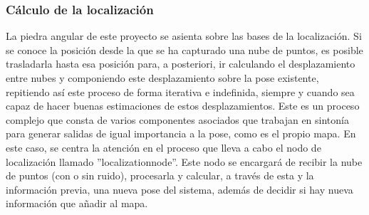 \documentclass[12pt, a4paper, twoside]{article}
\begin{document}
\subsubsection{Cálculo de la localización}
La piedra angular de este proyecto se asienta sobre las bases de la localización. Si se conoce la posición desde la que se ha capturado una nube de puntos, 
es posible trasladarla hasta esa posición para, a posteriori, ir calculando el desplazamiento entre nubes y componiendo este desplazamiento sobre la pose 
existente, repitiendo así este proceso de forma iterativa e indefinida, siempre y cuando sea capaz de hacer buenas estimaciones de estos desplazamientos. \newline
Este es un proceso complejo que consta de varios componentes asociados que trabajan en sintonía para generar salidas de igual importancia a la pose, como 
es el propio mapa. En este caso, se centra la atención en el proceso que lleva a cabo el nodo de localización llamado ''localization\textunderscore node''. 
Este nodo se encargará de recibir la nube de puntos (con o sin ruido), procesarla y calcular, a través de esta y la información previa, una nueva pose del sistema, 
además de decidir si hay nueva información que añadir al mapa.
\end{document}
